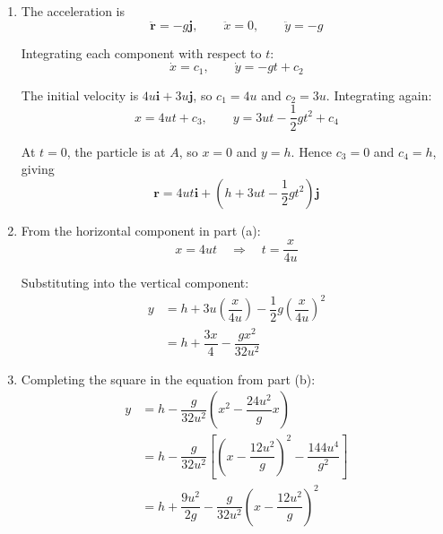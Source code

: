 \documentclass[leqno]{article}
\begin{document}
\begin{enumerate}[
  label=\textbf{\arabic*.},
  leftmargin=*,
  topsep=0pt,
  partopsep=0pt,
  parsep=0pt
]
\begin{djsSolution}
\begin{djsSolutionFigure}
\end{djsSolutionFigure}

\begin{enumerate}[label=\textbf{(\alph*)}, start=1]
\item The acceleration is
\[
\ddot{\mathbf r}=-g\mathbf j,
\qquad \ddot{x}=0,\qquad \ddot{y}=-g
\]

Integrating each component with respect to \(t\):
\[
\dot{x}=c_1,\qquad \dot{y}=-gt+c_2
\]

The initial velocity is \(4u\mathbf i+3u\mathbf j\), so \(c_1=4u\) and \(c_2=3u\). Integrating again:
\[
x=4ut+c_3,\qquad y=3ut-\dfrac12gt^2+c_4
\]

At \(t=0\), the particle is at \(A\), so \(x=0\) and \(y=h\). Hence \(c_3=0\) and \(c_4=h\), giving
\[
\mathbf r=4ut\mathbf i+\left(h+3ut-\dfrac12gt^2\right)\mathbf j
\]

\item From the horizontal component in part (a):
\[
x=4ut\quad\Longrightarrow\quad t=\dfrac{x}{4u}
\]

Substituting into the vertical component:
\begin{align*}
y&=h+3u\left(\dfrac{x}{4u}\right)-\dfrac12g\left(\dfrac{x}{4u}\right)^2\\
&=h+\dfrac{3x}{4}-\dfrac{gx^2}{32u^2}
\end{align*}

\item Completing the square in the equation from part (b):
\begin{align*}
y&=h-\dfrac{g}{32u^2}\left(x^2-\dfrac{24u^2}{g}x\right)\\
&=h-\dfrac{g}{32u^2}\left[\left(x-\dfrac{12u^2}{g}\right)^2-\dfrac{144u^4}{g^2}\right]\\
&=h+\dfrac{9u^2}{2g}-\dfrac{g}{32u^2}\left(x-\dfrac{12u^2}{g}\right)^2
\end{align*}


\end{enumerate}
\end{djsSolution}
\end{enumerate}
\end{document}
